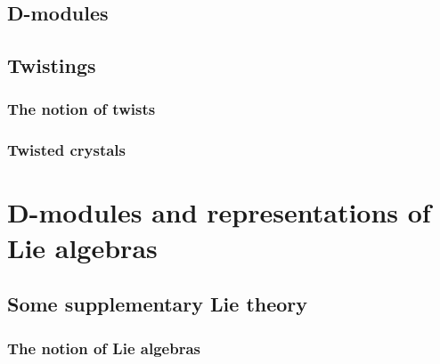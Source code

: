         \subsection{D-modules}
        
        \subsection{Twistings}
            \subsubsection{The notion of twists}
            
            \subsubsection{Twisted crystals}
    
    \section{D-modules and representations of Lie algebras}
        \subsection{Some supplementary Lie theory}
            \subsubsection{The notion of Lie algebras}
